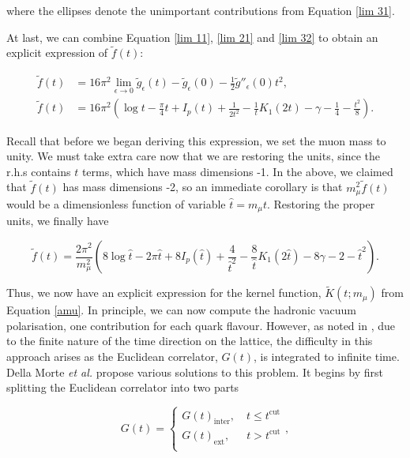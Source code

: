 \documentclass{article}
\numberwithin{equation}{section} %
\begin{document}
\noindent where the ellipses denote the unimportant contributions from Equation \ref{lim 31}.

At last, we can combine Equation \ref{lim 11}, \ref{lim 21} and \ref{lim 32} to obtain an explicit expression of $\tilde{f}(t)$:

\begin{equation}
\begin{split}
\tilde{f}(t)&= 16\pi^2 \lim_{\epsilon\rightarrow 0}\tilde{g}_\epsilon(t) - \tilde{g}_\epsilon(0) - \frac{1}{2} \tilde{g}''_\epsilon(0)t^2,\\
\tilde{f}(t)&= 16\pi^2 (\log t - \frac{\pi}{4}t + I_p(t) + \frac{1}{2t^2} - \frac{1}{t}K_1(2t) - \gamma - \frac{1}{4} - \frac{t^2}{8}).
\end{split}
\end{equation}

Recall that before we began deriving this expression, we set the muon mass to unity. We must take extra care now that we are restoring the units, since the r.h.s contains $t$ terms, which have mass dimensions -1. In the above, we claimed that $\tilde{f}(t)$ has mass dimensions -2, so an immediate corollary is that $m_\mu^2\tilde{f}(t)$ would be a dimensionless function of variable $\hat{t}=m_\mu t$. Restoring the proper units, we finally have

\begin{equation}
\tilde{f}(t)= \frac{2\pi^2}{m_\mu^2}(8\log \hat{t} - 2\pi \hat{t} + 8I_p(\hat{t}) + \frac{4}{\hat{t}^2} - \frac{8}{\hat{t}}K_1(2\hat{t}) - 8\gamma - 2 - \hat{t}^2).
\label{ftilde final}
\end{equation}

Thus, we now have an explicit expression for the kernel function, $\tilde{K}(t;m_\mu)$ from Equation \ref{amu}. In principle, we can now compute the hadronic vacuum polarisation, one contribution for each quark flavour. However, as noted in \cite{dellamorte}, due to the finite nature of the time direction on the lattice, the difficulty in this approach arises as the Euclidean correlator, $G(t)$, is integrated to infinite time. Della Morte \textit{et al.} propose various solutions to this problem. It begins by first splitting the Euclidean correlator into two parts

\begin{equation}
G(t)=
\begin{cases}
G(t)_{\mathrm{inter}}, \quad t \leq t^{\mathrm{cut}} \\
G(t)_{\mathrm{ext}}, \,\,\,\quad t > t^{\mathrm{cut}} \\
\end{cases},
\end{equation}
\end{document}
